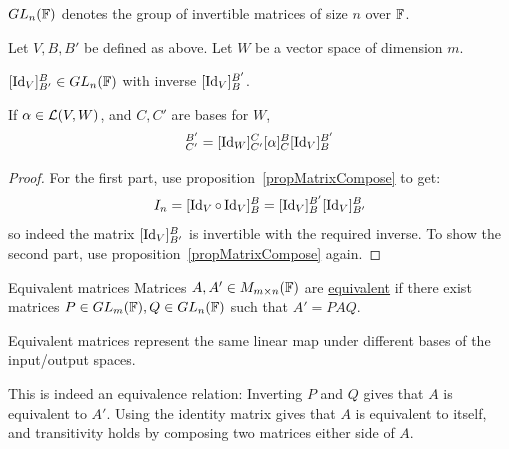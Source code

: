 \documentclass[../Main.tex]{subfiles}
\begin{document}
$GL_n(\mathbb{F})$ denotes the group of invertible matrices of size $n$ over $\mathbb{F}$.
\begin{propositions}{
        Let $V, B, B'$ be defined as above. Let $W$ be a vector space of dimension $m$.
        \label{propsChangeOfBasis}
    }
    \item $[\operatorname{Id}_V]_{B'}^B \in GL_n(\mathbb{F})$ with inverse $[\operatorname{Id}_V]_B^{B'}$. \label{propCOBInverse}
    \item If $\alpha \in \mathcal{L}(V, W)$, and $C, C'$ are bases for $W$,
        \begin{equation*}
            [\alpha]_{C'}^{B'} = [\Id_W]_{C'}^C [\alpha]_C^B [\Id_V]_B^{B'}
        \end{equation*}
\end{propositions}
\begin{proof}
    For the first part, use proposition~\ref{propMatrixCompose} to get:
    \begin{equation*}
        I_n = [\operatorname{Id}_V \circ \operatorname{Id}_V]_B^B = [\operatorname{Id}_V]_B^{B'} [\operatorname{Id}_V]_{B'}^B
    \end{equation*}
    so indeed the matrix $[\operatorname{Id}_V]_{B'}^B$ is invertible with the required inverse. To show the second part, use proposition~\ref{propMatrixCompose} again.
\end{proof}
\begin{definition}{Equivalent matrices}
    Matrices $A, A' \in M_{m \times n}(\mathbb{F})$ are \underline{equivalent} if there exist matrices $P \in GL_m(\mathbb{F}), Q \in GL_n(\mathbb{F})$ such that $A' = PAQ$.
\end{definition}
\begin{remarks}
    \item Equivalent matrices represent the same linear map under different bases of the input/output spaces.
    \item This is indeed an equivalence relation: Inverting $P$ and $Q$ gives that $A$ is equivalent to $A'$. Using the identity matrix gives that $A$ is equivalent to itself, and transitivity holds by composing two matrices either side of $A$.
\end{remarks}
\end{document}
